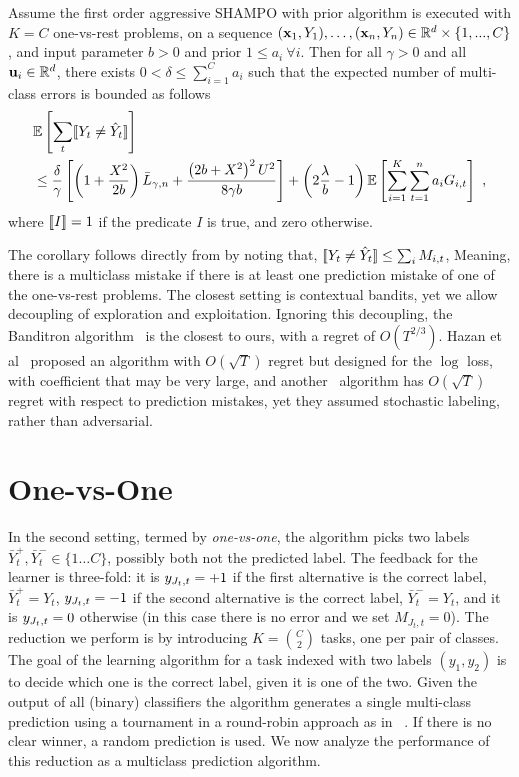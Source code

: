\begin{corollary}
Assume the first order aggressive SHAMPO with prior algorithm is executed with $K=C$ one-vs-rest 
problems, on a sequence 
$(\mathbf{x}_1,Y_1),\ldots,(\mathbf{x}_n,Y_n)\in\mathbb{R}^d\times\{1,...,C\}$, and input parameter $b>0$  and prior 
$1\le a_i~\forall i$. Then for all $\gamma>0$ and all $\mathbf{u}_{i}\in\mathbb{R}^d$, there 
exists $0<\delta\le \sum_{i=1}^{C}a_{i}$ such that the expected number of multi-class errors is bounded as follows
 \[
 \begin{split}
 &\mathbb{E}\left[{\sum_t [\![{Y_t \neq \hat{Y}_t}]\!]}\right]\\
 &\le \frac{\delta}{\gamma}\left[{\left(1+\frac{X^2}{2b} \right){\bar L}_{\gamma,n}+
 \frac{\left({2b+X^2}\right)^2U^2}{8{\gamma}b}}\right]
 +\left({2\frac{\lambda}{b}-1}\right)\mathbb{E}\left[{\sum_{i=1}^{K}\sum_{t=1}^{n}{a_{i}G_{i,t}}}\right]~,
 \end{split}
 \]
where $[\![{I}]\!]=1$ if the predicate $I$ is true, and zero otherwise.
\end{corollary}

\noindent
The corollary follows directly from  by noting that, 
$[\![{Y_t \neq \hat{Y}_t}]\!] \leq \sum_i M_{i,t}$, Meaning, there is a multiclass mistake if there is at least one 
prediction mistake of one of the one-vs-rest problems. The closest setting is contextual bandits, yet we 
allow decoupling of exploration and exploitation. Ignoring this decoupling, the 
Banditron algorithm~\cite{kakade2008efficient} is the closest to ours, 
with a regret of $O(T^{2/3})$. Hazan et al~\cite{hazan2011newtron} proposed an algorithm 
with $O(\sqrt{T})$ regret but designed for the $\log$ loss, with coefficient that may be very large, and 
another~\cite{DBLP:journals/ml/CrammerG13} algorithm has $O(\sqrt{T})$ regret with respect to prediction 
mistakes, yet they assumed stochastic labeling, rather than adversarial.


\section{One-vs-One}
In the second setting, termed by {\em one-vs-one}, the algorithm picks two labels 
$\bar{Y}^+_t,\bar{Y}^-_t \in\{1\dots C\}$, possibly both not the predicted label. 
The feedback for the learner is three-fold: it is $y_{J_t,t}=+1$ if the first alternative is the correct label, 
$\bar{Y}^+_t=Y_t$, $y_{J_t,t}=-1$ if the second alternative is the correct label, $\bar{Y}^-_t=Y_t$, 
and it is $y_{J_t,t}=0$ otherwise (in this case there is no error and we set $M_{J_t,t}=0$). 
The reduction we perform is by introducing $K= {C \choose 2}$ tasks, one per pair of classes.  
The goal of the learning algorithm for a task indexed with two labels $(y_1,y_2)$ is to decide 
which one is the correct label, given it is one of the two. Given the output of all (binary) classifiers the 
algorithm generates a single multi-class prediction using a tournament in a round-robin 
approach as in ~\cite{DBLP:journals/jmlr/Furnkranz02}. If there is no clear winner, a random prediction is used. 
We now analyze the performance of this reduction as a multiclass prediction algorithm.

